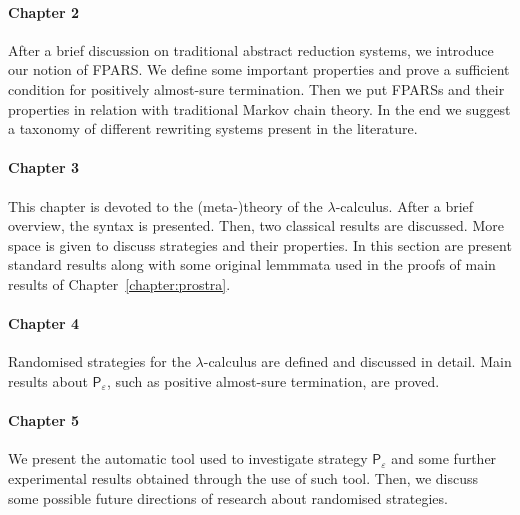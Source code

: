 \paragraph{Chapter 2} After a brief discussion on traditional abstract reduction systems, we introduce our notion of FPARS. We define some important properties and prove a sufficient condition for positively almost-sure termination. Then we put FPARSs and their properties in relation with traditional Markov chain theory. In the end we suggest a taxonomy of different rewriting systems present in the literature.
\paragraph{Chapter 3} This chapter is devoted to the (meta-)theory of the $\lambda$-calculus. After a brief overview, the syntax is presented. Then, two classical results are discussed. More space is given to discuss strategies and their properties. In this section are present standard results along with some original lemmmata used in the proofs of main results of Chapter~\ref{chapter:prostra}.
\paragraph{Chapter 4} Randomised strategies for the $\lambda$-calculus are defined and discussed in detail. Main results about $\mathsf{P}_\varepsilon$, such as positive almost-sure termination, are proved.
\paragraph{Chapter 5} We present the automatic tool used to investigate strategy $\mathsf{P}_\varepsilon$ and some further experimental results obtained through the use of such tool. Then, we discuss some possible future directions of research about randomised strategies.
